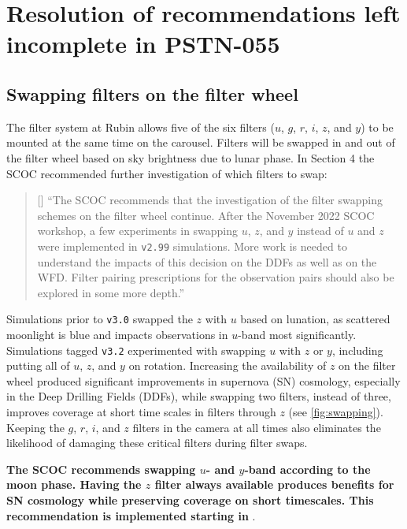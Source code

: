 
\clearpage

\section{Resolution of recommendations left incomplete in PSTN-055} \label{sec:openquestions}

\subsection{Swapping filters on the filter wheel}\label{sec:filterswap}
The filter system at Rubin allows five of the six filters ($u$, $g$, $r$, $i$, $z$, and $y$) to be mounted at the same time on the carousel. 
Filters will be swapped in and out of the filter wheel based on sky brightness due to lunar phase. 
In  Section 4 the SCOC recommended further investigation of which filters to swap: 
\begin{quote}{[] ``The SCOC recommends that the investigation of the filter swapping schemes on the filter wheel continue. After the November 2022 SCOC workshop, a few experiments in swapping $u$, $z$, and $y$ instead of $u$ and $z$ were implemented in \texttt{v2.99} simulations. More work is needed to understand the impacts of this decision on the DDFs as well as on the WFD. Filter pairing prescriptions for the observation pairs should also be explored in some more depth.''}
\end{quote}

 Simulations prior to \texttt{v3.0} swapped the $z$ with $u$ based on lunation, as scattered moonlight is blue and impacts observations in $u$-band most significantly. Simulations tagged \texttt{v3.2}  experimented with  swapping $u$ with $z$ or $y$, including putting all of $u$, $z$, and $y$ on rotation. Increasing the availability of $z$ on the filter wheel produced significant improvements in supernova (SN) cosmology, especially in the Deep Drilling Fields (DDFs), while swapping two filters, instead of three, improves coverage at short time scales in filters through $z$ (see \autoref{fig:swapping}). Keeping the $g$, $r$, $i$, and $z$ filters in the camera at all times also eliminates the likelihood of damaging these critical filters during filter swaps.
 
{\bf The SCOC recommends swapping $u$- and $y$-band according to the moon phase. Having the $z$ filter always available produces benefits for SN cosmology while preserving coverage on short timescales. This recommendation is implemented starting in }.

